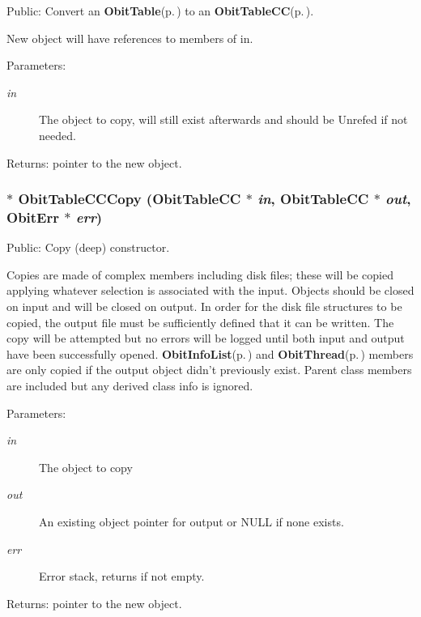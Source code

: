 Public: Convert an {\bf Obit\-Table}{\rm (p.\,\pageref{structObitTable})} to an {\bf Obit\-Table\-CC}{\rm (p.\,\pageref{structObitTableCC})}. 

New object will have references to members of in. \begin{Desc}
\item[Parameters:]
\begin{description}
\item[{\em in}]The object to copy, will still exist afterwards and should be Unrefed if not needed. \end{description}
\end{Desc}
\begin{Desc}
\item[Returns:]pointer to the new object. \end{Desc}
\subsubsection{$\ast$ Obit\-Table\-CCCopy ({\bf Obit\-Table\-CC} $\ast$ {\em in}, {\bf Obit\-Table\-CC} $\ast$ {\em out}, {\bf Obit\-Err} $\ast$ {\em err})}\label{ObitTableCC_8h_a14}


Public: Copy (deep) constructor. 

Copies are made of complex members including disk files; these will be copied applying whatever selection is associated with the input. Objects should be closed on input and will be closed on output. In order for the disk file structures to be copied, the output file must be sufficiently defined that it can be written. The copy will be attempted but no errors will be logged until both input and output have been successfully opened. {\bf Obit\-Info\-List}{\rm (p.\,\pageref{structObitInfoList})} and {\bf Obit\-Thread}{\rm (p.\,\pageref{structObitThread})} members are only copied if the output object didn't previously exist. Parent class members are included but any derived class info is ignored. \begin{Desc}
\item[Parameters:]
\begin{description}
\item[{\em in}]The object to copy \item[{\em out}]An existing object pointer for output or NULL if none exists. \item[{\em err}]Error stack, returns if not empty. \end{description}
\end{Desc}
\begin{Desc}
\item[Returns:]pointer to the new object. \end{Desc}
